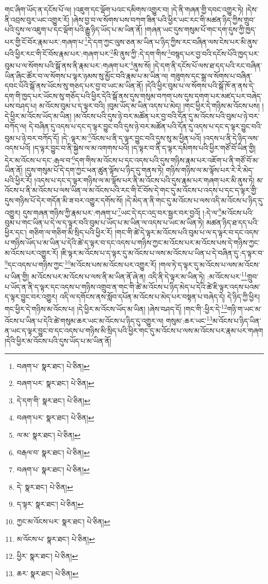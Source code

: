 གང་ཞིག་ཡོད་ན་དངོས་པོ་ལ། །འཇུག་དང་ལྡོག་པའང་དམིགས་འགྱུར་བ། །དེ་ནི་གཞན་གྱི་དབང་འགྱུར་ཏེ། །དེས་ནི་འབྲས་བུར་ཡང་འགྱུར་རོ། །ཞེས་བྱ་བ་ལ་སོགས་པས་བཀག་ཟིན་པའི་ཕྱིར་ཡང་རང་གི་མཚན་ཉིད་ཀྱིས་གྲུབ་པའི་དུས་ལ་འཇུག་པ་དང་ལྡོག་པའི་རྒྱུ་ཉིད་ཡོད་པ་མ་ཡིན་ནོ། །གཞན་ཡང་དུས་གསུམ་པོ་གང་དག་དུས་ཀྱི་ཁྱད་པར་གྱི་ངོ་བོར་རྣམ་པར་:གཞག་པ་\footnote{བཞག་པ་  སྣར་ཐང་།  པེ་ཅིན། }དེ་དག་ཀྱང་ལུས་ཅན་མ་ཡིན་པ་ཉིད་ཀྱིས་རང་བཞིན་ལས་ངེས་པར་མི་ནུས་པའི་ཕྱིར་རང་གི་ངོ་བོས་རྣམ་པར་:གཞག་པར་\footnote{བཞག་པར་  སྣར་ཐང་།  པེ་ཅིན། }མི་ནུས་ཀྱི་:དེ་དག་གིས་\footnote{དེ་དག་གི་  སྣར་ཐང་།  པེ་ཅིན། }བསྙད་པར་བྱ་བའི་དངོས་པོའི་ཁྱད་པར་བུམ་པ་ལ་སོགས་པའི་སྒོ་ནས་ནི་རྣམ་པར་:གཞག་པར་\footnote{བཞག་པར་  སྣར་ཐང་།  པེ་ཅིན། }ནུས་སོ། །དེ་དག་ནི་དངོས་པོ་ལས་ཐ་དད་པའི་རང་བཞིན་ཡིན་ཞིང་ཚོར་བ་ལ་སོགས་པ་ལྟར་ཉམས་སུ་མྱོང་བའི་རྣམ་པ་མ་ཡིན་ལ། གཟུགས་དང་སྒྲ་ལ་སོགས་པ་བཞིན་དབང་པོའི་སྒོ་ནས་ཡོངས་སུ་གཅད་པར་བྱ་བ་ཡང་མ་ཡིན་ནོ། །དེའི་ཕྱིར་བུམ་པ་ལ་སོགས་པའི་སྒོ་ཁོ་ན་ནས་དེ་དག་གི་ཁྱད་པར་ཡོངས་སུ་གཅོད་པའི་ཕྱིར་དེའི་སྒོ་ནས་དུས་གསུམ་བཀག་པས་དུས་དགག་པར་མཛད་པར་བཞེད་པས་བཤད་པ། མ་འོངས་བུམ་པ་ད་ལྟར་བའི། །བུམ་ཡོད་མ་ཡིན་འདས་པ་མེད། །གང་ཕྱིར་དེ་གཉིས་མ་འོངས་པས། །དེ་ཕྱིར་མ་འོངས་ཡོད་མ་ཡིན། །མ་འོངས་པའི་དུས་ཉེ་བར་མཚོན་པར་བྱ་བའི་དོན་དུ་མ་འོངས་པའི་བུམ་པ་ཉེ་བར་བཀོད་ལ། དེ་བཞིན་དུ་འདས་པ་དང་ད་ལྟར་བྱུང་བའི་དུས་ཉེ་བར་མཚོན་པའི་དོན་དུ་འདས་པ་དང་ད་ལྟར་བྱུང་བའི་བུམ་པ་ཉེ་བར་བཀོད་དོ། །དེ་:ལྟར་མ་\footnote{ལ་མ་  སྣར་ཐང་།  པེ་ཅིན། }འོངས་པ་ནི་ད་ལྟར་བྱུང་བའི་དུས་སུ་མ་ཕྱིན་པའོ། །འདས་པ་ནི་དེ་ཉིད་ལས་འདས་པའོ། །ད་ལྟར་བྱུང་བ་ནི་སྐྱེས་ལ་མ་འགགས་པའོ། །ད་ལྟར་བ་ནི་ད་ལྟར་དམིགས་པའི་ཕྱིར་གཙོ་བོ་ཡིན་གྱི། དེར་མ་འོངས་པ་དང་:རྒལ་བ་\footnote{བརྒལ་བ་  སྣར་ཐང་།  པེ་ཅིན། }དག་གིས་མ་འོངས་པ་དང་འདས་པའི་དུས་གཉིས་རྣམ་པར་འཇོག་པ་ནི་གཙོ་བོ་མ་ཡིན་ནོ། །དུས་གསུམ་པོ་དེ་དག་ཀྱང་ཕན་ཚུན་ལྟོས་པ་ཉིད་དུ་གནས་ཏེ། གཉིས་གཉིས་ལ་མ་ལྟོས་པར་རེ་རེ་མེད་པའི་ཕྱིར་རོ། །འདས་པ་དང་ད་ལྟར་གཉིས་ལ་མ་ལྟོས་པར་ནི་མ་འོངས་པའི་དུས་རྣམ་པར་གཞག་པར་མི་ནུས་ཏེ། མ་འོངས་པ་ནི་མ་འོངས་པ་ལས་ཡིན་ལ་མ་འོངས་པའི་རང་གི་ངོ་བོས་དེ་གང་དུ་མ་འོངས་པ་འདས་པ་དང་ད་ལྟར་གྱི་དུས་གཉིས་པོ་དེར་གདོན་མི་ཟ་བར་འགྱུར་དགོས་སོ། །དེ་མེད་ན་ནི་གང་དུ་མ་འོངས་པ་ལས་འདི་མ་འོངས་པ་ཉིད་དུ་འགྱུར། དུས་གཞན་གཉིས་ཀྱི་རྣམ་པར་:གཞག་པ་\footnote{བཞག་པ་  སྣར་ཐང་།  པེ་ཅིན། }ཡང་དེ་དང་འདྲ་བར་སྦྱར་བར་བྱའོ། །:དེ་ལ་\footnote{དེ་  སྣར་ཐང་།  པེ་ཅིན། }མ་འོངས་པའི་བུམ་པ་གང་ཡིན་པ་དེ་ལ་ད་ལྟར་བའི་བུམ་པ་ཡོད་པ་མ་ཡིན་ལ་འདས་པ་ཡང་མ་ཡིན་ཏེ། མཚན་ཉིད་ཐ་དད་པའི་ཕྱིར་དང་། གཅིག་ལ་གཅིག་མི་སྲིད་པའི་ཕྱིར་རོ། །གང་གི་ཚེ་དེ་ལྟར་མ་འོངས་པའི་བུམ་པ་ལ་ད་ལྟར་བ་དང་འདས་པ་གཉིས་ཡོད་པ་མ་ཡིན་པ་དེའི་ཚེ་ད་ལྟར་བ་དང་འདས་པ་གཉིས་ཀྱང་མ་འོངས་པར་མ་འོངས་པས་དེ་གཉིས་ཀྱང་མ་འོངས་པར་འགྱུར་རོ། །ཇི་ལྟར་མ་འོངས་པ་ད་ལྟར་དུ་མ་འོངས་པ་ལས་མ་འོངས་པ་ཡིན་པ་དེ་བཞིན་དུ་:ད་ལྟར་བ་\footnote{ད་ལྟར་  སྣར་ཐང་།  པེ་ཅིན། }དང་འདས་པ་གཉིས་ཀྱང་\footnote{ཀྱང་མ་འོངས་པར་  སྣར་ཐང་།  པེ་ཅིན། }མ་འོངས་པས་མ་འོངས་པར་འགྱུར་རོ། །གལ་ཏེ་ད་ལྟར་དུ་མ་འོངས་པ་ལས་མ་འོངས་པ་ཡིན་གྱི། མ་འོངས་པར་མ་འོངས་པ་ལས་ནི་མ་ཡིན་ནོ་ཞེ་ན། འདི་ནི་དེ་ལྟར་མ་ཡིན་ཏེ། :མ་འོངས་པར་\footnote{མ་འོངས་པ་  སྣར་ཐང་།  པེ་ཅིན། }གྲུབ་པ་ཡོད་ན་ནི་ད་ལྟར་དང་འདས་པ་གཉིས་འགྲུབ་ན་གང་གི་ཚེ་མ་འོངས་པ་ཉིད་མེད་པ་དེའི་ཚེ་ཇི་ལྟར་འདས་པའམ་ད་ལྟར་བྱུང་བར་འགྱུར། འདི་ལ་དགོངས་ནས་སློབ་དཔོན་མ་འོངས་པ་མེད་པར་བསྟན་པ་བཞེད་དེ། དེ་ཉིད་ཀྱི་ཕྱིར། གང་ཕྱིར་དེ་གཉིས་མ་འོངས་པ། །དེ་ཕྱིར་མ་འོངས་ཡོད་མ་ཡིན། །ཞེས་བཤད་དོ། །གང་གི་:ཕྱིར་དེ་\footnote{ཕྱིར་  སྣར་ཐང་།  པེ་ཅིན། }གཉི་ག་ཡང་མ་འོངས་པ་ཡིན་པ་དེའི་ཚེ་གསུམ་ཆར་ཡང་མ་འོངས་པ་ཉིད་དུ་འགྱུར་ལ། གསུམ་:ཆར་ཡང་\footnote{ཆར་  སྣར་ཐང་།  པེ་ཅིན། }མ་འོངས་པ་ཉིད་ཡིན་ན་ཡང་ད་ལྟར་བྱུང་བ་དང་འདས་པ་གཉིས་མི་སྲིད་པའི་ཕྱིར་གང་དུ་མ་འོངས་པ་ལས་མ་འོངས་པར་རྣམ་པར་གཞག །དེའི་ཕྱིར་མ་འོངས་པའི་དུས་ཡོད་པ་མ་ཡིན་ནོ། 